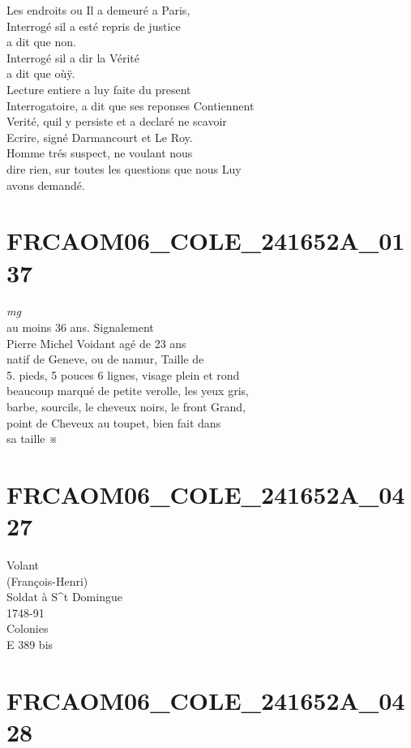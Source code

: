 \documentclass{article}
\begin{document}
\begin{pages}
Les endroits ou Il a demeuré a Paris,\\
Interrogé sil a esté repris de justice\\
a dit que non.\\
Interrogé sil a dir la Vérité\\
a dit que oùÿ.\\
Lecture entiere a luy faite du present\\
Interrogatoire, a dit que ses reponses Contiennent\\
Verité, quil y persiste et a declaré ne scavoir\\
Ecrire, signé Darmancourt et Le Roy.\\
Homme trés suspect, ne voulant nous\\
dire rien, sur toutes les questions que nous Luy\\
avons demandé.
\pend
\endnumbering\beginnumbering\section{FRCAOM06\_COLE\_241652A\_0137}
\vspace{0.5cm}\noindent
\textit{mg}
\footnotesize \\
au moins 36 ans.
\normalsize \pstart
Signalement\\
Pierre Michel Voidant agé de 23 ans\\
natif de Geneve, ou de namur, Taille de\\
5. pieds, 5 pouces 6 lignes, visage plein et rond\\
beaucoup marqué de petite verolle, les yeux gris,\\
barbe, sourcils, le cheveux noirs, le front Grand,\\
point de Cheveux au toupet, bien fait dans\\
sa taille ※
\pend
\endnumbering\beginnumbering\section{FRCAOM06\_COLE\_241652A\_0427}\pstart
Volant\\
(François-Henri)\\
Soldat à S\^{}t Domingue\\
1748-91\\
Colonies\\
E 389 bis
\pend
\endnumbering\beginnumbering\section{FRCAOM06\_COLE\_241652A\_0428}

\end{pages}
\end{document}
